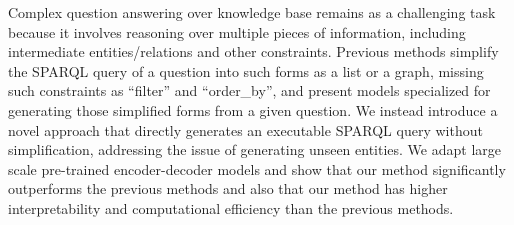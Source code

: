 Complex question answering over knowledge base remains as a challenging task because it involves reasoning over multiple pieces of information, including intermediate entities/relations and other constraints. Previous methods simplify the SPARQL query of a question into such forms as a list or a graph, missing such constraints as ``filter'' and ``order\_by'', and present models specialized for generating those simplified forms from a given question. We instead introduce a novel approach that directly generates an executable SPARQL query without simplification, addressing the issue of generating unseen entities. We adapt large scale pre-trained encoder-decoder models and show that our method significantly outperforms the previous methods and also that our method has higher interpretability and computational efficiency than the previous methods.
